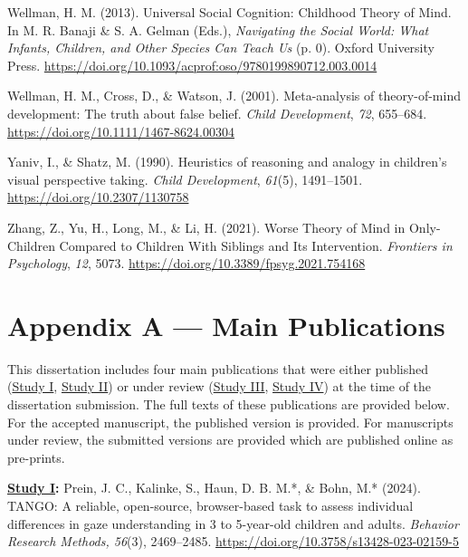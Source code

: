 \documentclass[
]{scrbook}
\newlength{\cslhangindent}
\newenvironment{CSLReferences}[2] %
 {\begin{list}{}{%
  \setlength{\itemindent}{0pt}
  \setlength{\leftmargin}{0pt}
  \setlength{\parsep}{0pt}
  \ifodd #1
   \setlength{\leftmargin}{\cslhangindent}
   \setlength{\itemindent}{-1\cslhangindent}
  \fi
  \setlength{\itemsep}{#2\baselineskip}}}
 {\end{list}}
\begin{document}
\begin{CSLReferences}{1}{0}
Wellman, H. M. (2013). Universal {Social Cognition}: {Childhood Theory} of {Mind}. In M. R. Banaji \& S. A. Gelman (Eds.), \emph{Navigating the {Social World}: {What Infants}, {Children}, and {Other Species Can Teach Us}} (p. 0). Oxford University Press. \url{https://doi.org/10.1093/acprof:oso/9780199890712.003.0014}

Wellman, H. M., Cross, D., \& Watson, J. (2001). Meta-analysis of theory-of-mind development: {The} truth about false belief. \emph{Child Development}, \emph{72}, 655--684. \url{https://doi.org/10.1111/1467-8624.00304}

Yaniv, I., \& Shatz, M. (1990). Heuristics of reasoning and analogy in children's visual perspective taking. \emph{Child Development}, \emph{61}(5), 1491--1501. \url{https://doi.org/10.2307/1130758}

Zhang, Z., Yu, H., Long, M., \& Li, H. (2021). Worse {Theory} of {Mind} in {Only-Children Compared} to {Children With Siblings} and {Its Intervention}. \emph{Frontiers in Psychology}, \emph{12}, 5073. \url{https://doi.org/10.3389/fpsyg.2021.754168}

\end{CSLReferences}

\chapter{Appendix A --- Main Publications}\label{appendixA}

This dissertation includes four main publications that were either published (\hyperref[studyI]{Study I}, \hyperref[studyII]{Study II}) or under review (\hyperref[studyIII]{Study III}, \hyperref[studyIV]{Study IV}) at the time of the dissertation submission. The full texts of these publications are provided below. For the accepted manuscript, the published version is provided. For manuscripts under review, the submitted versions are provided which are published online as pre-prints.

\textbf{\hyperref[studyI]{Study I}:} Prein, J. C., Kalinke, S., Haun, D. B. M.*, \& Bohn, M.* (2024). TANGO: A reliable, open-source, browser-based task to assess individual differences in gaze understanding in 3 to 5-year-old children and adults. \emph{Behavior Research Methods, 56}(3), 2469--2485. \mbox{\url{https://doi.org/10.3758/s13428-023-02159-5}}
\end{document}
